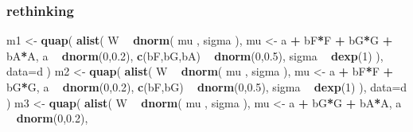 \documentclass[
]{article}
\newenvironment{Shaded}{\begin{snugshade}}{\end{snugshade}}
\newcommand{\DataTypeTok}[1]{\textcolor[rgb]{0.13,0.29,0.53}{#1}}
\newcommand{\DecValTok}[1]{\textcolor[rgb]{0.00,0.00,0.81}{#1}}
\newcommand{\FloatTok}[1]{\textcolor[rgb]{0.00,0.00,0.81}{#1}}
\newcommand{\KeywordTok}[1]{\textcolor[rgb]{0.13,0.29,0.53}{\textbf{#1}}}
\newcommand{\NormalTok}[1]{#1}
\newcommand{\OperatorTok}[1]{\textcolor[rgb]{0.81,0.36,0.00}{\textbf{#1}}}
\newcommand{\StringTok}[1]{\textcolor[rgb]{0.31,0.60,0.02}{#1}}
\begin{document}
\hypertarget{rethinking-2}{%
\subsubsection{rethinking}\label{rethinking-2}}

\begin{Shaded}
\begin{Highlighting}[]
\NormalTok{m1 <-}\StringTok{ }\KeywordTok{quap}\NormalTok{(}
    \KeywordTok{alist}\NormalTok{(}
\NormalTok{        W }\OperatorTok{~}\StringTok{ }\KeywordTok{dnorm}\NormalTok{( mu , sigma ),}
\NormalTok{        mu <-}\StringTok{ }\NormalTok{a }\OperatorTok{+}\StringTok{ }\NormalTok{bF}\OperatorTok{*}\NormalTok{F }\OperatorTok{+}\StringTok{ }\NormalTok{bG}\OperatorTok{*}\NormalTok{G }\OperatorTok{+}\StringTok{ }\NormalTok{bA}\OperatorTok{*}\NormalTok{A,}
\NormalTok{        a }\OperatorTok{~}\StringTok{ }\KeywordTok{dnorm}\NormalTok{(}\DecValTok{0}\NormalTok{,}\FloatTok{0.2}\NormalTok{),}
        \KeywordTok{c}\NormalTok{(bF,bG,bA) }\OperatorTok{~}\StringTok{ }\KeywordTok{dnorm}\NormalTok{(}\DecValTok{0}\NormalTok{,}\FloatTok{0.5}\NormalTok{),}
\NormalTok{        sigma }\OperatorTok{~}\StringTok{ }\KeywordTok{dexp}\NormalTok{(}\DecValTok{1}\NormalTok{)}
\NormalTok{    ), }\DataTypeTok{data=}\NormalTok{d )}
\NormalTok{m2 <-}\StringTok{ }\KeywordTok{quap}\NormalTok{(}
    \KeywordTok{alist}\NormalTok{(}
\NormalTok{        W }\OperatorTok{~}\StringTok{ }\KeywordTok{dnorm}\NormalTok{( mu , sigma ),}
\NormalTok{        mu <-}\StringTok{ }\NormalTok{a }\OperatorTok{+}\StringTok{ }\NormalTok{bF}\OperatorTok{*}\NormalTok{F }\OperatorTok{+}\StringTok{ }\NormalTok{bG}\OperatorTok{*}\NormalTok{G,}
\NormalTok{        a }\OperatorTok{~}\StringTok{ }\KeywordTok{dnorm}\NormalTok{(}\DecValTok{0}\NormalTok{,}\FloatTok{0.2}\NormalTok{),}
        \KeywordTok{c}\NormalTok{(bF,bG) }\OperatorTok{~}\StringTok{ }\KeywordTok{dnorm}\NormalTok{(}\DecValTok{0}\NormalTok{,}\FloatTok{0.5}\NormalTok{),}
\NormalTok{        sigma }\OperatorTok{~}\StringTok{ }\KeywordTok{dexp}\NormalTok{(}\DecValTok{1}\NormalTok{)}
\NormalTok{    ), }\DataTypeTok{data=}\NormalTok{d )}
\NormalTok{m3 <-}\StringTok{ }\KeywordTok{quap}\NormalTok{(}
    \KeywordTok{alist}\NormalTok{(}
\NormalTok{        W }\OperatorTok{~}\StringTok{ }\KeywordTok{dnorm}\NormalTok{( mu , sigma ),}
\NormalTok{        mu <-}\StringTok{ }\NormalTok{a }\OperatorTok{+}\StringTok{ }\NormalTok{bG}\OperatorTok{*}\NormalTok{G }\OperatorTok{+}\StringTok{ }\NormalTok{bA}\OperatorTok{*}\NormalTok{A,}
\NormalTok{        a }\OperatorTok{~}\StringTok{ }\KeywordTok{dnorm}\NormalTok{(}\DecValTok{0}\NormalTok{,}\FloatTok{0.2}\NormalTok{),}

\end{Highlighting}
\end{Shaded}
\end{document}

